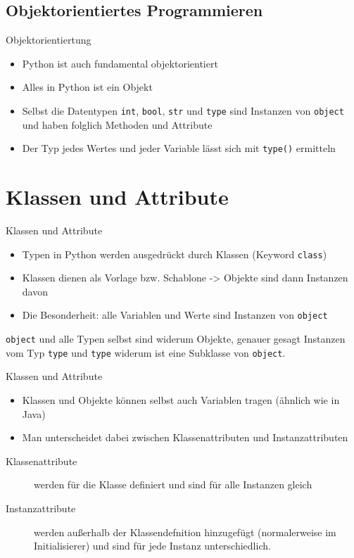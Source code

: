 \subsection{Objektorientiertes Programmieren}
\begin{frame}[fragile]{Objektorientiertung}
	\begin{itemize}
		\item Python ist auch fundamental objektorientiert
		\item Alles in Python ist ein Objekt
		\item Selbst die Datentypen \texttt{int}, \texttt{bool}, \texttt{str} und \texttt{type} sind Instanzen von \texttt{object} und haben folglich Methoden und Attribute
		\item Der Typ jedes Wertes und jeder Variable lässt sich mit \texttt{type()} ermitteln
	\end{itemize}
\end{frame}

\section{Klassen und Attribute}
\begin{frame}[fragile]{Klassen und Attribute}
	\begin{itemize}
		\item Typen in Python werden ausgedrückt durch Klassen (Keyword \texttt{class})
		\item Klassen dienen als Vorlage bzw. Schablone -> Objekte sind dann Instanzen davon
		\item Die Besonderheit: alle Variablen und Werte sind Instanzen von \texttt{object}
	\end{itemize}
	\texttt{object} und alle Typen selbst sind widerum Objekte, genauer gesagt Instanzen vom Typ \texttt{type} und \texttt{type} widerum ist eine Subklasse von \texttt{object}.
\end{frame}

\begin{frame}[fragile]{Klassen und Attribute}
	\begin{itemize}
		\item Klassen und Objekte können selbst auch Variablen tragen (ähnlich wie in Java)
		\item Man unterscheidet dabei zwischen Klassenattributen und Instanzattributen
	\end{itemize}

	\begin{description}
		\item[Klassenattribute] werden für die Klasse definiert und sind für alle Instanzen gleich
		\item[Instanzattribute] werden außerhalb der Klassendefnition hinzugefügt (normalerweise im Initialisierer) und sind für jede Instanz unterschiedlich.
	\end{description}
\end{frame}

